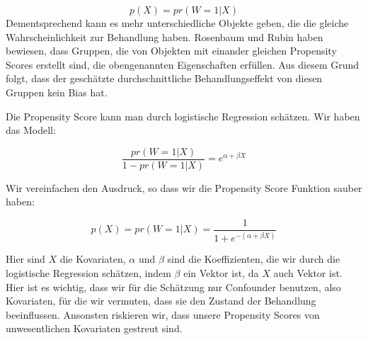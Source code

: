 \documentclass[12pt,a4paper,twoside]{scrartcl}
\numberwithin{equation}{section}
\begin{document}
\begin{equation}\label{eq:2.6}
 p(X) = pr(W=1|X)
\end{equation}
Dementsprechend kann es mehr unterschiedliche Objekte geben, die die gleiche Wahrscheinlichkeit zur Behandlung haben. Rosenbaum und Rubin haben bewiesen, dass Gruppen, die von Objekten mit einander gleichen Propensity Scores erstellt sind, die obengenannten Eigenschaften erfüllen. Aus diesem Grund folgt, dass der geschätzte durchschnittliche Behandlungseffekt von diesen Gruppen kein Bias hat\cite{rosenbaum1983central}. \par 

\noindent 
Die Propensity Score kann man durch logistische Regression schätzen. Wir haben das Modell:\par

\begin{equation}\label{eq:2.7}
  \frac{pr(W=1|X)}{1-pr(W=1|X)} = e^{\alpha+\beta X}
\end{equation}

\noindent
Wir vereinfachen den Ausdruck, so dass wir die Propensity Score Funktion sauber haben:\par

\begin{equation}\label{eq:2.8}
  p(X)= pr(W=1|X) = \frac{1}{1 + e^{-(\alpha+\beta X)}}
\end{equation}

\noindent
Hier sind $X$ die Kovariaten, $\alpha$ und $\beta$ sind die Koeffizienten, die wir durch die logistische Regression schätzen, indem $\beta$ ein Vektor ist, da $X$ auch Vektor ist. Hier ist es wichtig, dass wir für die Schätzung nur Confounder benutzen, also Kovariaten, für die wir vermuten, dass sie den Zustand der Behandlung beeinflussen. Ansonsten riskieren wir, dass unsere Propensity Scores von unwesentlichen Kovariaten gestreut sind.\par 
\end{document}
